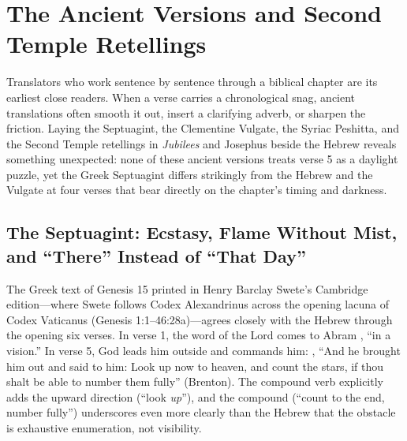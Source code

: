 \section{The Ancient Versions and Second Temple Retellings}

Translators who work sentence by sentence through a biblical chapter are its earliest close readers. When a verse carries a chronological snag, ancient translations often smooth it out, insert a clarifying adverb, or sharpen the friction. Laying the Septuagint, the Clementine Vulgate, the Syriac Peshitta, and the Second Temple retellings in \emph{Jubilees} and Josephus beside the Hebrew reveals something unexpected: none of these ancient versions treats verse 5 as a daylight puzzle, yet the Greek Septuagint differs strikingly from the Hebrew and the Vulgate at four verses that bear directly on the chapter's timing and darkness.

\subsection{The Septuagint: Ecstasy, Flame Without Mist, and ``There'' Instead of ``That Day''}

The Greek text of Genesis 15 printed in Henry Barclay Swete's Cambridge edition---where Swete follows Codex Alexandrinus across the opening lacuna of Codex Vaticanus (Genesis 1:1--46:28a)---agrees closely with the Hebrew through the opening six verses. In verse 1, the word of the Lord comes to Abram , ``in a vision.'' In verse 5, God leads him outside and commands him: , ``And he brought him out and said to him: Look up now to heaven, and count the stars, if thou shalt be able to number them fully'' (Brenton). The compound verb  explicitly adds the upward direction (``look \emph{up}''), and the compound  (``count to the end, number fully'') underscores even more clearly than the Hebrew that the obstacle is exhaustive enumeration, not visibility.

